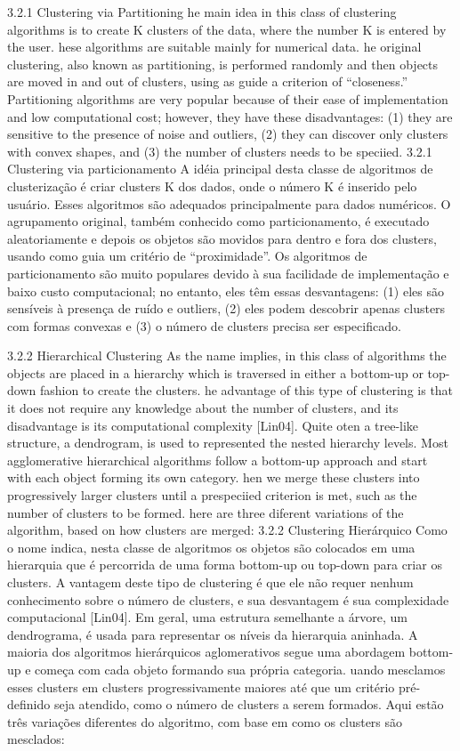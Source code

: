 3.2.1 Clustering via Partitioning
he main idea in this class of clustering algorithms is to create K clusters of the data, where the number K is entered by the user. hese algorithms are suitable mainly for numerical data. he original clustering, also known as partitioning, is performed randomly and then objects are moved in and out of clusters, using as guide a criterion of “closeness.” Partitioning algorithms are very popular because of their ease of implementation and low computational cost; however, they have these disadvantages: (1) they are sensitive to the presence of noise and outliers, (2) they can discover only clusters with convex shapes, and (3) the number of clusters needs to be speciied.
3.2.1 Clustering via particionamento
A idéia principal desta classe de algoritmos de clusterização é criar clusters K dos dados, onde o número K é inserido pelo usuário. Esses algoritmos são adequados principalmente para dados numéricos. O agrupamento original, também conhecido como particionamento, é executado aleatoriamente e depois os objetos são movidos para dentro e fora dos clusters, usando como guia um critério de “proximidade”. Os algoritmos de particionamento são muito populares devido à sua facilidade de implementação e baixo custo computacional; no entanto, eles têm essas desvantagens: (1) eles são sensíveis à presença de ruído e outliers, (2) eles podem descobrir apenas clusters com formas convexas e (3) o número de clusters precisa ser especificado.

3.2.2 Hierarchical Clustering
As the name implies, in this class of algorithms the objects are placed in a hierarchy which is traversed in either a bottom-up or top-down fashion to create the clusters. he advantage of this type of clustering is that it does not require any knowledge about the number of clusters, and its disadvantage is its computational complexity [Lin04]. Quite oten a tree-like structure, a dendrogram, is used to represented the nested hierarchy levels. Most agglomerative hierarchical algorithms follow a bottom-up approach and start with each object forming its own category. hen we merge these clusters into progressively larger clusters until a prespeciied criterion is met, such as the number of clusters to be formed. here are three diferent variations of the algorithm, based on how clusters are merged:
3.2.2 Clustering Hierárquico
Como o nome indica, nesta classe de algoritmos os objetos são colocados em uma hierarquia que é percorrida de uma forma bottom-up ou top-down para criar os clusters. A vantagem deste tipo de clustering é que ele não requer nenhum conhecimento sobre o número de clusters, e sua desvantagem é sua complexidade computacional [Lin04]. Em geral, uma estrutura semelhante a árvore, um dendrograma, é usada para representar os níveis da hierarquia aninhada. A maioria dos algoritmos hierárquicos aglomerativos segue uma abordagem bottom-up e começa com cada objeto formando sua própria categoria. uando mesclamos esses clusters em clusters progressivamente maiores até que um critério pré-definido seja atendido, como o número de clusters a serem formados. Aqui estão três variações diferentes do algoritmo, com base em como os clusters são mesclados:

